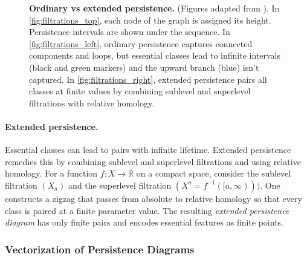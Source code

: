 \begin{figure}[t]
  \caption{\textbf{Ordinary vs extended persistence.} (Figures adapted from \cite{perslay}). In \ref{fig:filtrations_top}, each node of the graph is assigned its height. Persistence intervals are shown under the sequence. In \ref{fig:filtrations_left}, ordinary persistence captures connected components and loops, but essential classes lead to infinite intervals (black and green markers) and the upward branch (blue) isn't captured. In \ref{fig:filtrations_right}, extended persistence pairs all classes at finite values by combining sublevel and superlevel filtrations with relative homology.}
  \label{fig:filtrations}
\end{figure}


\paragraph{Extended persistence.}
Essential classes can lead to pairs with infinite lifetime. Extended persistence remedies this by combining sublevel and superlevel filtrations and using relative homology. For a function $f:X\to\mathbb{R}$ on a compact space, consider the sublevel filtration $(X_a)$ and the superlevel filtration $(X^a = f^{-1}([a,\infty)))$. One constructs a zigzag that passes from absolute to relative homology so that every class is paired at a finite parameter value. The resulting \emph{extended persistence diagram} has only finite pairs and encodes essential features as finite points.


\subsubsection{Vectorization of Persistence Diagrams}
\label{sssec:vectorization_persistence_diagrams}


